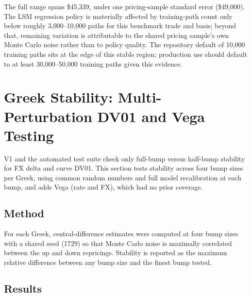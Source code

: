 \documentclass[conference]{IEEEtran}
\begin{document}
The full range spans \$45,339, under one pricing-sample standard error (\$49,000). The LSM regression policy is materially affected by training-path count only below roughly 3,000--10,000 paths for this benchmark trade and basis; beyond that, remaining variation is attributable to the shared pricing sample's own Monte Carlo noise rather than to policy quality. The repository default of 10,000 training paths sits at the edge of this stable region; production use should default to at least 30,000--50,000 training paths given this evidence.

\section{Greek Stability: Multi-Perturbation DV01 and Vega Testing}
\label{sec:greek-stability}

V1 and the automated test suite check only full-bump versus half-bump stability for FX delta and curve DV01. This section tests stability across four bump sizes per Greek, using common random numbers and full model recalibration at each bump, and adds Vega (rate and FX), which had no prior coverage.

\subsection{Method}

For each Greek, central-difference estimates were computed at four bump sizes with a shared seed (1729) so that Monte Carlo noise is maximally correlated between the up and down repricings. Stability is reported as the maximum relative difference between any bump size and the finest bump tested.

\subsection{Results}
\end{document}
